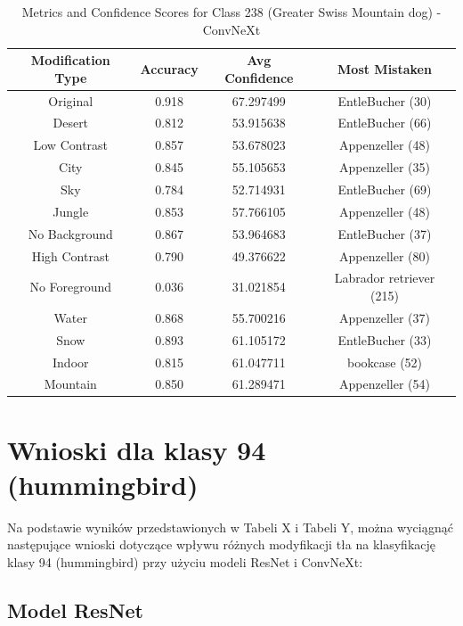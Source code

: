 \begin{table}
	\centering
	\begin{tabular}{|c|c|c|c|}
		\hline
		\textbf{Modification Type} & \textbf{Accuracy} & \textbf{Avg Confidence} & \textbf{Most Mistaken} \\
		\hline
		Original & 0.918 & 67.297499 & EntleBucher (30) \\
		\hline
		Desert & 0.812 & 53.915638 & EntleBucher (66) \\
		\hline
		Low Contrast & 0.857 & 53.678023 & Appenzeller (48) \\
		\hline
		City & 0.845 & 55.105653 & Appenzeller (35) \\
		\hline
		Sky & 0.784 & 52.714931 & EntleBucher (69) \\
		\hline
		Jungle & 0.853 & 57.766105 & Appenzeller (48) \\
		\hline
		No Background & 0.867 & 53.964683 & EntleBucher (37) \\
		\hline
		High Contrast & 0.790 & 49.376622 & Appenzeller (80) \\
		\hline
		No Foreground & 0.036 & 31.021854 & Labrador retriever (215) \\
		\hline
		Water & 0.868 & 55.700216 & Appenzeller (37) \\
		\hline
		Snow & 0.893 & 61.105172 & EntleBucher (33) \\
		\hline
		Indoor & 0.815 & 61.047711 & bookcase (52) \\
		\hline
		Mountain & 0.850 & 61.289471 & Appenzeller (54) \\
		\hline
	\end{tabular}
	\caption{Metrics and Confidence Scores for Class 238 (Greater Swiss Mountain dog) - ConvNeXt}
	\label{tab:metrics_confidence_class_238_convnext}
\end{table}

\section*{Wnioski dla klasy 94 (hummingbird)}

Na podstawie wyników przedstawionych w Tabeli X i Tabeli Y, można wyciągnąć następujące wnioski dotyczące wpływu różnych modyfikacji tła na klasyfikację klasy 94 (hummingbird) przy użyciu modeli ResNet i ConvNeXt:

\subsection*{Model ResNet}

